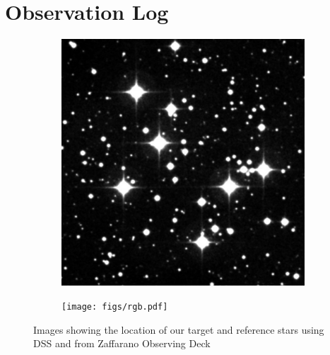 \documentclass[%
aip,
jmp,
reprint,
floatfix
]{revtex4-1}
\begin{document}



	\onecolumngrid
	\appendix
	\section{Observation Log}

	\begin{table}[H]
		\centering
		
		\label{table:log}
	\end{table}
	
	
	\begin{figure}[H]
		\centering
		\begin{subfigure}[]{.45\textwidth}
			\centering
			\includegraphics[width=\textwidth]{figs/dss.pdf}
		\end{subfigure}
		\qquad
		\begin{subfigure}[]{.45\textwidth}
			\centering
			\texttt{[image: figs/rgb.pdf]}
		\end{subfigure}
		\caption{Images showing the location of our target and reference stars using DSS and from Zaffarano Observing Deck}
		\label{fig:map}
	\end{figure}
\end{document}
